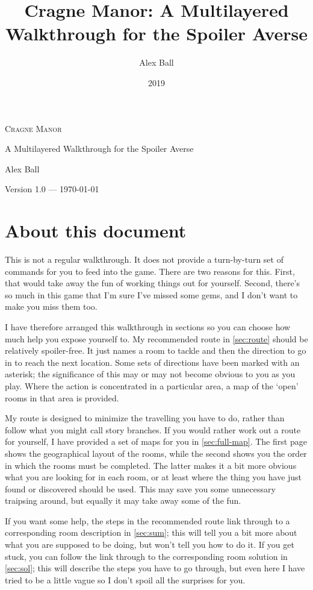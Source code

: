 \documentclass[a5paper]{extarticle}
\title{Cragne Manor: A Multilayered Walkthrough for the Spoiler Averse}
\author{Alex Ball}
\date{2019}
\begin{document}
\thispagestyle{empty}
\begin{center}
\Huge\textsc{Cragne Manor}

\huge A Multilayered Walkthrough for the Spoiler Averse\par

\bigskip
\Large Alex Ball\par
\end{center}
{\centering\Large Version 1.0 --- \today\par}
\newpage

\tableofcontents

\newpage
\section{About this document}\label{sec:about}

This is not a regular walkthrough.
It does not provide a turn-by-turn set of commands for you to feed into the game.
There are two reasons for this.
First, that would take away the fun of working things out for yourself.
Second, there's so much in this game that I'm sure I've missed some gems,
and I don't want to make you miss them too.

I have therefore arranged this walkthrough in sections so you can choose how much help you expose yourself to.
My recommended route in \cref{sec:route} should be relatively spoiler-free.
It just names a room to tackle and then the direction to go in to reach the next location.
Some sets of directions have been marked with an asterisk;
the significance of this may or may not become obvious to you as you play.
Where the action is concentrated in a particular area,
a map of the ‘open’ rooms in that area is provided.

My route is designed to minimize the travelling you have to do,
rather than follow what you might call story branches.
If you would rather work out a route for yourself,
I have provided a set of maps for you in \cref{sec:full-map}.
The first page shows the geographical layout of the rooms,
while the second shows you the order in which the rooms must be completed.
The latter makes it a bit more obvious what you are looking for in each room,
or at least where the thing you have just found or discovered should be used.
This may save you some unnecessary traipsing around,
but equally it may take away some of the fun.

If you want some help, the steps in the recommended route link through to a
corresponding room description in \cref{sec:sum};
this will tell you a bit more about what you are supposed to be doing,
but won't tell you how to do it.
If you get stuck, you can follow the link through to the corresponding room solution in \cref{sec:sol};
this will describe the steps you have to go through,
but even here I have tried to be a little vague so I don't spoil all the surprises for you.
\end{document}
